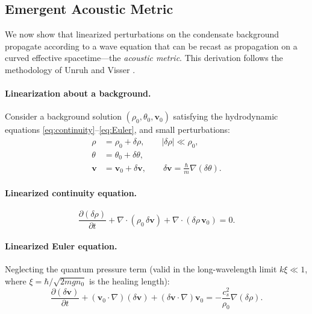 \subsection{Emergent Acoustic Metric}
\label{sec:acoustic_metric}

We now show that linearized perturbations on the condensate background propagate according to a wave equation that can be recast as propagation on a curved effective spacetime---the \emph{acoustic metric}. This derivation follows the methodology of Unruh \cite{Unruh1981} and Visser \cite{Visser1998}.

\paragraph{Linearization about a background.}
Consider a background solution $(\rho_0, \theta_0, \mathbf{v}_0)$ satisfying the hydrodynamic equations \eqref{eq:continuity}--\eqref{eq:Euler}, and small perturbations:
\begin{align}
\rho &= \rho_0 + \delta\rho, \qquad |\delta\rho| \ll \rho_0, \\
\theta &= \theta_0 + \delta\theta, \\
\mathbf{v} &= \mathbf{v}_0 + \delta\mathbf{v}, \qquad \delta\mathbf{v} = \frac{\hbar}{m} \nabla(\delta\theta).
\end{align}

\paragraph{Linearized continuity equation.}
\begin{equation}
\label{eq:lin_continuity}
\frac{\partial (\delta\rho)}{\partial t} + \nabla \cdot (\rho_0 \, \delta\mathbf{v}) + \nabla \cdot (\delta\rho \, \mathbf{v}_0) = 0.
\end{equation}

\paragraph{Linearized Euler equation.}
Neglecting the quantum pressure term (valid in the long-wavelength limit $k\xi \ll 1$, where $\xi = \hbar/\sqrt{2m g n_0}$ is the healing length):
\begin{equation}
\label{eq:lin_Euler}
\frac{\partial (\delta\mathbf{v})}{\partial t} + (\mathbf{v}_0 \cdot \nabla)(\delta\mathbf{v}) + (\delta\mathbf{v} \cdot \nabla)\mathbf{v}_0 = -\frac{c_s^2}{\rho_0} \nabla(\delta\rho).
\end{equation}

